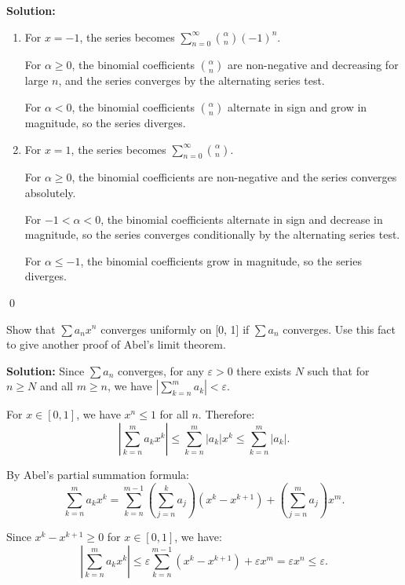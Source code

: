 \bigskip\noindent\textbf{Solution:}
\begin{enumerate}[label=(\alph*)]
\item For \( x = -1 \), the series becomes \( \sum_{n=0}^\infty \binom{\alpha}{n} (-1)^n \).

For \( \alpha \geq 0 \), the binomial coefficients \( \binom{\alpha}{n} \) are non-negative and decreasing for large \( n \), and the series converges by the alternating series test.

For \( \alpha < 0 \), the binomial coefficients \( \binom{\alpha}{n} \) alternate in sign and grow in magnitude, so the series diverges.

\item For \( x = 1 \), the series becomes \( \sum_{n=0}^\infty \binom{\alpha}{n} \).

For \( \alpha \geq 0 \), the binomial coefficients are non-negative and the series converges absolutely.

For \( -1 < \alpha < 0 \), the binomial coefficients alternate in sign and decrease in magnitude, so the series converges conditionally by the alternating series test.

For \( \alpha \leq -1 \), the binomial coefficients grow in magnitude, so the series diverges.
\end{enumerate}\qed


\begin{problembox}
Show that \( \sum a_n x^n \) converges uniformly on [0, 1] if \( \sum a_n \) converges. Use this fact to give another proof of Abel's limit theorem.
\end{problembox}

\bigskip\noindent\textbf{Solution:} Since \( \sum a_n \) converges, for any \( \varepsilon > 0 \) there exists \( N \) such that for \( n \geq N \) and all \( m \geq n \), we have \( |\sum_{k=n}^m a_k| < \varepsilon \).

For \( x \in [0, 1] \), we have \( x^n \leq 1 \) for all \( n \). Therefore:
\[\left|\sum_{k=n}^m a_k x^k\right| \leq \sum_{k=n}^m |a_k| x^k \leq \sum_{k=n}^m |a_k|.\]

By Abel's partial summation formula:
\[\sum_{k=n}^m a_k x^k = \sum_{k=n}^{m-1} \left(\sum_{j=n}^k a_j\right)(x^k - x^{k+1}) + \left(\sum_{j=n}^m a_j\right)x^m.\]

Since \( x^k - x^{k+1} \geq 0 \) for \( x \in [0, 1] \), we have:
\[\left|\sum_{k=n}^m a_k x^k\right| \leq \varepsilon \sum_{k=n}^{m-1} (x^k - x^{k+1}) + \varepsilon x^m = \varepsilon x^n \leq \varepsilon.\]

